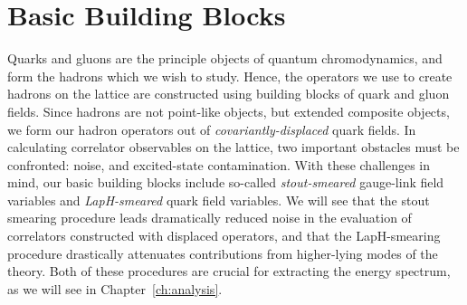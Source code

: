\section{Basic Building Blocks}
    Quarks and gluons are the principle objects of quantum chromodynamics, and form the hadrons which we wish to study. Hence, the operators we use to create hadrons on the lattice are constructed using building blocks of quark and gluon fields. Since hadrons are not point-like objects, but extended composite objects, we form our hadron operators out of \textit{covariantly-displaced} quark fields. In calculating correlator observables on the lattice, two important obstacles must be confronted:  noise, and excited-state contamination. With these challenges in mind, our basic building blocks include so-called \textit{stout-smeared} gauge-link field variables and \textit{LapH-smeared} quark field variables. We will see that the stout smearing procedure leads dramatically reduced noise in the evaluation of correlators constructed with displaced operators, and that the LapH-smearing procedure drastically attenuates contributions from higher-lying modes of the theory. Both of these procedures are crucial for extracting the energy spectrum, as we will see in Chapter~\ref{ch:analysis}.
